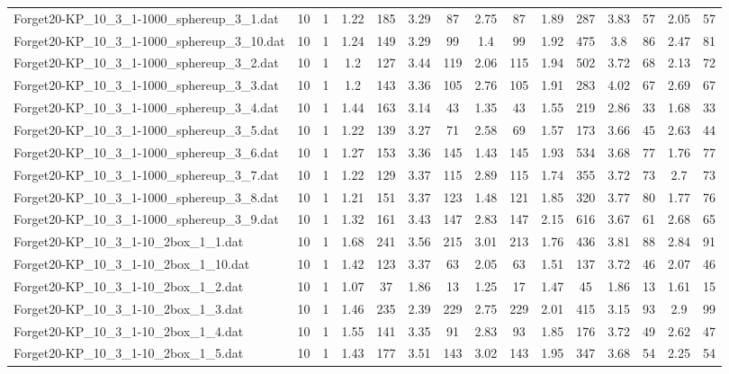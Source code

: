 \begin{table}[!ht]
{\begin{tabular}{lcccccccccccccc}
Forget20-KP\_10\_3\_1-1000\_sphereup\_3\_1.dat & 10 & 1 & 1.22 & 185 & 3.29 & 87 & 2.75 & 87 & 1.89 & 287 & 3.83 & 57 & 2.05 & 57 \\
Forget20-KP\_10\_3\_1-1000\_sphereup\_3\_10.dat & 10 & 1 & 1.24 & 149 & 3.29 & 99 & 1.4 & 99 & 1.92 & 475 & 3.8 & 86 & 2.47 & 81 \\
Forget20-KP\_10\_3\_1-1000\_sphereup\_3\_2.dat & 10 & 1 & 1.2 & 127 & 3.44 & 119 & 2.06 & 115 & 1.94 & 502 & 3.72 & 68 & 2.13 & 72 \\
Forget20-KP\_10\_3\_1-1000\_sphereup\_3\_3.dat & 10 & 1 & 1.2 & 143 & 3.36 & 105 & 2.76 & 105 & 1.91 & 283 & 4.02 & 67 & 2.69 & 67 \\
Forget20-KP\_10\_3\_1-1000\_sphereup\_3\_4.dat & 10 & 1 & 1.44 & 163 & 3.14 & 43 & 1.35 & 43 & 1.55 & 219 & 2.86 & 33 & 1.68 & 33 \\
Forget20-KP\_10\_3\_1-1000\_sphereup\_3\_5.dat & 10 & 1 & 1.22 & 139 & 3.27 & 71 & 2.58 & 69 & 1.57 & 173 & 3.66 & 45 & 2.63 & 44 \\
Forget20-KP\_10\_3\_1-1000\_sphereup\_3\_6.dat & 10 & 1 & 1.27 & 153 & 3.36 & 145 & 1.43 & 145 & 1.93 & 534 & 3.68 & 77 & 1.76 & 77 \\
Forget20-KP\_10\_3\_1-1000\_sphereup\_3\_7.dat & 10 & 1 & 1.22 & 129 & 3.37 & 115 & 2.89 & 115 & 1.74 & 355 & 3.72 & 73 & 2.7 & 73 \\
Forget20-KP\_10\_3\_1-1000\_sphereup\_3\_8.dat & 10 & 1 & 1.21 & 151 & 3.37 & 123 & 1.48 & 121 & 1.85 & 320 & 3.77 & 80 & 1.77 & 76 \\
Forget20-KP\_10\_3\_1-1000\_sphereup\_3\_9.dat & 10 & 1 & 1.32 & 161 & 3.43 & 147 & 2.83 & 147 & 2.15 & 616 & 3.67 & 61 & 2.68 & 65 \\
Forget20-KP\_10\_3\_1-10\_2box\_1\_1.dat & 10 & 1 & 1.68 & 241 & 3.56 & 215 & 3.01 & 213 & 1.76 & 436 & 3.81 & 88 & 2.84 & 91 \\
Forget20-KP\_10\_3\_1-10\_2box\_1\_10.dat & 10 & 1 & 1.42 & 123 & 3.37 & 63 & 2.05 & 63 & 1.51 & 137 & 3.72 & 46 & 2.07 & 46 \\
Forget20-KP\_10\_3\_1-10\_2box\_1\_2.dat & 10 & 1 & 1.07 & 37 & 1.86 & 13 & 1.25 & 17 & 1.47 & 45 & 1.86 & 13 & 1.61 & 15 \\
Forget20-KP\_10\_3\_1-10\_2box\_1\_3.dat & 10 & 1 & 1.46 & 235 & 2.39 & 229 & 2.75 & 229 & 2.01 & 415 & 3.15 & 93 & 2.9 & 99 \\
Forget20-KP\_10\_3\_1-10\_2box\_1\_4.dat & 10 & 1 & 1.55 & 141 & 3.35 & 91 & 2.83 & 93 & 1.85 & 176 & 3.72 & 49 & 2.62 & 47 \\
Forget20-KP\_10\_3\_1-10\_2box\_1\_5.dat & 10 & 1 & 1.43 & 177 & 3.51 & 143 & 3.02 & 143 & 1.95 & 347 & 3.68 & 54 & 2.25 & 54 \\

\end{tabular}}
\end{table}
